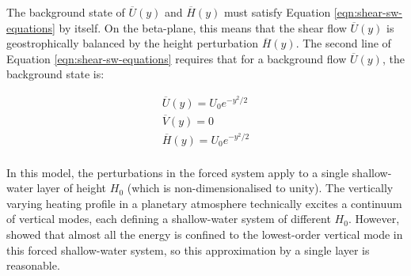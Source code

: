 
The background state of $\overline{U}(y)$ and $\overline{H}(y)$ must satisfy Equation \ref{eqn:shear-sw-equations} by itself. On the beta-plane, this means that the shear flow $\overline{U}(y)$ is geostrophically balanced by the height perturbation $\overline{H}(y)$. The second line of Equation \ref{eqn:shear-sw-equations} requires that for a background flow $\overline{U}(y)$, the background state is:

\begin{equation}\label{eqn:sw-eqns-1}
  \begin{gathered}
\overline{U}(y) =  U_{0} e^{-y^{2}/2} \\
\overline{V}(y) =  0 \\
\overline{H}(y) =  U_{0} e^{-y^{2}/2} \\
  \end{gathered}
\end{equation}

In this model, the perturbations in the forced system apply to a single shallow-water layer of height $H_{0}$ (which is non-dimensionalised to unity). The vertically varying heating profile in a planetary atmosphere technically excites a continuum of vertical modes, each defining a shallow-water system of different $H_{0}$. However, \citet{tsai2014three} showed that almost all the energy is confined to the lowest-order vertical mode in this forced shallow-water system, so this approximation by a single layer is reasonable.




